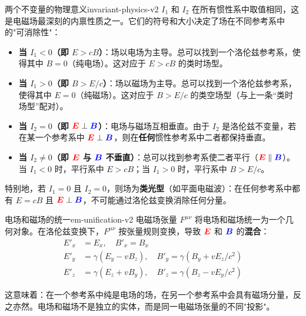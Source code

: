 \documentclass[11pt,a4paper,openany,oneside]{book}
\newcommand{\vecE}{\textcolor{red}{\vect{E}}}
\newcommand{\vecB}{\textcolor{blue}{\vect{B}}}
\newcommand{\vect}[1]{\bm{#1}}
\begin{document}
\begin{insight}{两个不变量的物理意义}{invariant-physics-v2}
$I_1$ 和 $I_2$ 在所有惯性系中取值相同，这是电磁场最深刻的内禀性质之一。它们的符号和大小决定了场在不同参考系中的"可消除性"：
\begin{itemize}
\item \textbf{当 $I_1<0$（即 $E>cB$）}：场以电场为主导。总可以找到一个洛伦兹参考系，使得其中 $B=0$（纯电场）。这对应于 $E>cB$ 的类时场型。
\item \textbf{当 $I_1>0$（即 $B>E/c$）}：场以磁场为主导。总可以找到一个洛伦兹参考系，使得其中 $E=0$（纯磁场）。这对应于 $B>E/c$ 的类空场型（与上一条“类时场型”配对）。
\item \textbf{当 $I_2=0$（即 $\vecE\perp\vecB$）}：电场与磁场互相垂直。由于 $I_2$ 是洛伦兹不变量，若在某一个参考系中 $\vecE\perp\vecB$，则在\textbf{任何}惯性参考系中二者都保持垂直。
\item \textbf{当 $I_2\neq 0$（即 $\vecE$ 与 $\vecB$ 不垂直）}：总可以找到参考系使二者平行（$\vecE\parallel\vecB$）。当 $I_1<0$ 时，平行系中 $E>cB$；当 $I_1>0$ 时，平行系中 $B>E/c$。
\end{itemize}

特别地，若 $I_1=0$ 且 $I_2=0$，则场为\textbf{类光型}（如平面电磁波）：在任何参考系中都有 $E=cB$ 且 $\vecE\perp\vecB$，不可能通过洛伦兹变换消除任何分量。
\end{insight}

\begin{insight}{电场和磁场的统一}{em-unification-v2}
电磁场张量 $F^{\mu\nu}$ 将电场和磁场统一为一个几何对象。在洛伦兹变换下，$F^{\mu\nu}$ 按张量规则变换，导致 $\vecE$ 和 $\vecB$ 的\textbf{混合}：
\begin{align*}
E'_x &= E_x, \quad B'_x = B_x \\
E'_y &= \gamma(E_y - vB_z), \quad B'_y = \gamma(B_y + vE_z/c^2) \\
E'_z &= \gamma(E_z + vB_y), \quad B'_z = \gamma(B_z - vE_y/c^2)
\end{align*}

这意味着：在一个参考系中纯是电场的场，在另一个参考系中会具有磁场分量，反之亦然。电场和磁场不是独立的实体，而是同一电磁场张量的不同"投影"。
\end{insight}
\end{document}

